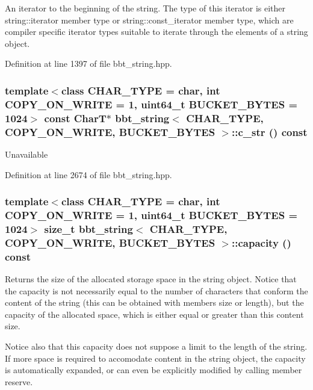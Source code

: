 An iterator to the beginning of the string. The type of this iterator is either string::iterator member type or string::const\_\-iterator member type, which are compiler specific iterator types suitable to iterate through the elements of a string object. 

Definition at line 1397 of file bbt\_\-string.hpp.\hypertarget{classbbt__string_c153fa7ac5477ba7ef44c684cb396c0b}{
\subsubsection[{c\_\-str}]{\setlength{\rightskip}{0pt plus 5cm}template$<$class CHAR\_\-TYPE  = char, int COPY\_\-ON\_\-WRITE = 1, uint64\_\-t BUCKET\_\-BYTES = 1024$>$ const CharT$\ast$ {\bf bbt\_\-string}$<$ CHAR\_\-TYPE, COPY\_\-ON\_\-WRITE, BUCKET\_\-BYTES $>$::c\_\-str () const}}
\label{classbbt__string_c153fa7ac5477ba7ef44c684cb396c0b}


Unavailable 

Definition at line 2674 of file bbt\_\-string.hpp.\hypertarget{classbbt__string_43171d8b0097837372a408ec693559e6}{
\subsubsection[{capacity}]{\setlength{\rightskip}{0pt plus 5cm}template$<$class CHAR\_\-TYPE  = char, int COPY\_\-ON\_\-WRITE = 1, uint64\_\-t BUCKET\_\-BYTES = 1024$>$ size\_\-t {\bf bbt\_\-string}$<$ CHAR\_\-TYPE, COPY\_\-ON\_\-WRITE, BUCKET\_\-BYTES $>$::capacity () const}}
\label{classbbt__string_43171d8b0097837372a408ec693559e6}


Returns the size of the allocated storage space in the string object. Notice that the capacity is not necessarily equal to the number of characters that conform the content of the string (this can be obtained with members size or length), but the capacity of the allocated space, which is either equal or greater than this content size.

Notice also that this capacity does not suppose a limit to the length of the string. If more space is required to accomodate content in the string object, the capacity is automatically expanded, or can even be explicitly modified by calling member reserve.

